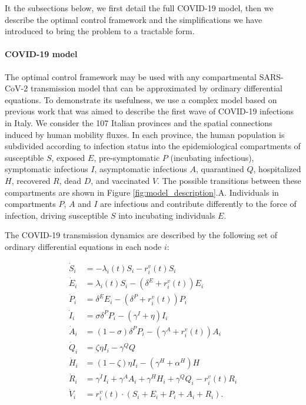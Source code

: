 It the subsections below, we first detail the full COVID-19 model, then we describe the optimal control framework and the simplifications we have introduced to bring the problem to a tractable form.

\paragraph{COVID-19 model}
The optimal control framework may be used with any compartmental SARS-CoV-2 transmission model that can be approximated by ordinary differential equations. To demonstrate its usefulness, we use a complex model based on previous work that was aimed to describe the first wave of COVID-19 infections in Italy\cite{Gatto:SpreadDynamicsCOVID19:2020,Bertuzzo:GeographyCOVID19Spread:2020}. We consider the 107 Italian provinces and the spatial connections induced by human mobility fluxes. In each province, the human population is subdivided according to infection status into the epidemiological compartments of susceptible $S$, exposed $E$, pre-symptomatic $P$ (incubating infectious), symptomatic infectious $I$, asymptomatic infectious $A$, quarantined $Q$, hospitalized $H$, recovered $R$, dead $D$, and vaccinated $V$. The possible transitions between these compartments are shown in Figure \ref{fig:model_description}.A. Individuals in compartments $P$, $A$ and $I$ are infectious and contribute differently to the force of infection, driving susceptible $S$ into incubating individuals $E$. 

The COVID-19 transmission dynamics are described by the following set of ordinary differential equations in each node $i$: 

\begin{equation}\label{eq:sepiar}
\begin{split}
    \dot{S}_i &= - \lambda_i(t) S_i - r^v_i(t) S_i \\
    \dot{E}_i &= \lambda_i(t) S_i -  (\delta^E + r^v_i(t)) E_i \\
    \dot{P}_i &= \delta^E E_i -  (\delta^P+r^v_i(t))  P_i \\
    \dot{I}_i &= \sigma \delta^P P_i - (\gamma^I + \eta)  I_i \\
    \dot{A}_i &= (1 - \sigma) \delta^P P_i - (\gamma^A+ r^v_i(t)) A_i \\
    \dot{Q}_i &= \zeta \eta I_i - \gamma^Q Q \\
    \dot{H}_i &= (1-\zeta) \eta I_i - (\gamma^H + \alpha^H)H \\
    \dot{R}_i &= \gamma^I I_i + \gamma^A A_i + \gamma^H H_i + \gamma^Q Q_i - r^v_i(t) R_i\\
    \dot{V}_i &= r^v_i(t) \cdot (S_i + E_i + P_i + A_i + R_i).
\end{split}
\end{equation}

